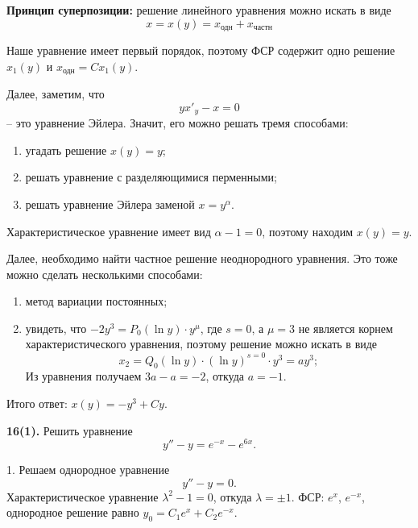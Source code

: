 \textbf{Принцип суперпозиции:} решение линейного уравнения можно искать в виде
\begin{equation*}
    x = x(y) = x_{\text{одн}} + x_{\text{частн}}
\end{equation*}

Наше уравнение имеет первый порядок, поэтому ФСР содержит одно решение $x_1(y)$ и $x_{\text{одн}} = Cx_1(y)$.

Далее, заметим, что
\begin{equation*}
    yx'_y - x = 0
\end{equation*}
-- это уравнение Эйлера. Значит, его можно решать тремя способами:
\begin{enumerate}
    \item угадать решение $x(y) = y$;
    \item решать уравнение с разделяющимися перменными;
    \item решать уравнение Эйлера заменой $x = y^{\alpha}$.
\end{enumerate}

Характеристическое уравнение имеет вид $\alpha - 1 = 0$, поэтому находим $x(y) = y$.

Далее, необходимо найти частное решение неоднородного уравнения. Это тоже можно сделать несколькими способами:
\begin{enumerate}
    \item метод вариации постоянных;
    \item увидеть, что $-2y^3 = P_0(\ln y) \cdot y^{\mu}$, где $s = 0$, а $\mu = 3$ не является корнем характеристического уравнения, поэтому решение можно искать в виде
    \begin{equation*}
        x_2 = Q_0(\ln y)\cdot (\ln y)^{s = 0} \cdot y^3 = ay^3;
    \end{equation*}
    Из уравнения получаем $3a - a = -2$, откуда $a = -1$.
\end{enumerate}

Итого ответ: $x(y) = -y^3 + Cy$.

\begin{task}
    \textbf{16(1).} Решить уравнение
    \begin{equation*}
        y'' - y = e^{-x} - e^{6x}.
    \end{equation*}
\end{task}

1. Решаем однородное уравнение
\begin{equation*}
    y'' - y = 0.
\end{equation*}
Характеристическое уравнение $\lambda^2 - 1 = 0$, откуда $\lambda = \pm 1$. ФСР: $e^x$, $e^{-x}$, однородное решение равно $y_0 = C_1e^x + C_2e^{-x}$.

